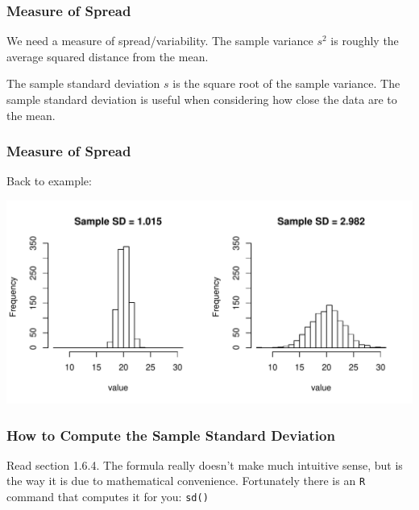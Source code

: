 \documentclass[handout]{beamer}
\newcommand{\blue}[1]{\textcolor{blue2}{#1}}
\begin{document}
\begin{frame}[fragile]
\frametitle{Measure of Spread}

We need a measure of \blue{spread/variability}.  The \blue{sample variance $s^2$} is roughly the average squared distance from the mean.

\vspace{0.5cm}

\pause The \blue{sample standard deviation $s$} is the square root of the sample variance. The sample standard deviation is useful when considering how close the data are to the mean.

\end{frame}



\begin{frame}[fragile]
\frametitle{Measure of Spread}
Back to example:
\begin{center}
\includegraphics[width=\textwidth]{figure/spread2.pdf}
\end{center}

\end{frame}



\begin{frame}[fragile]
\frametitle{How to Compute the Sample Standard Deviation}

Read section 1.6.4.  The formula really doesn't make much intuitive sense, but is the way it is due to mathematical convenience.  Fortunately there is an {\tt R} command that computes it for you: {\tt sd()}

\end{frame}
\end{document}
